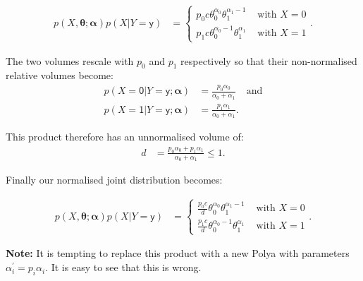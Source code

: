 \documentclass[oneside,english]{scrbook}
\begin{document}
\begin{align*}
  p(X,\bm{\theta};\bm{\alpha})p(X|Y=\mathsf{y}) &= \left\{
  \begin{array}{lr}
    p_0c\theta_0^{\alpha_0}\theta_1^{\alpha_1-1} & \mbox{ with } X=0\\
    p_1c\theta_0^{\alpha_0-1}\theta_1^{\alpha_1} & \mbox{ with } X=1
  \end{array}
  \right..
\end{align*}

The two volumes rescale with $p_0$ and $p_1$ respectively so that
their non-normalised relative volumes become:
\begin{align*}
  p(X=\mathsf{0}|Y=\mathsf{y};\bm{\alpha}) &= \frac{p_0\alpha_0}{\alpha_0+\alpha_1} & \text{and}\\
  p(X=\mathsf{1}|Y=\mathsf{y};\bm{\alpha}) &= \frac{p_1\alpha_1}{\alpha_0+\alpha_1}.
\end{align*}

This product therefore has an unnormalised volume of:
\begin{align*}
  d &= \frac{p_0\alpha_0 + p_1\alpha_1}{\alpha_0+\alpha_1} \leq 1.
\end{align*}

Finally our normalised joint distribution becomes:

\begin{align}
  p(X,\bm{\theta};\bm{\alpha})p(X|Y=\mathsf{y}) &= \left\{
  \begin{array}{lr}
    \frac{p_0c}{d}\theta_0^{\alpha_0}\theta_1^{\alpha_1-1} & \mbox{ with } X=0\\
    \frac{p_1c}{d}\theta_0^{\alpha_0-1}\theta_1^{\alpha_1} & \mbox{ with } X=1
  \end{array}
  \right.. \label{eq:polya_updated}
\end{align}

\textbf{Note:} It is tempting to replace this product with a new Polya
with parameters $\alpha_i^{'} = p_i\alpha_i$. It is easy to see that
this is wrong.
\end{document}
